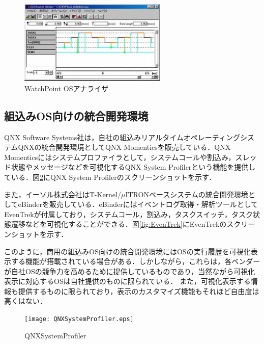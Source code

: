 \begin{figure}
\begin{center}
\includegraphics[height=4cm]{watchpoint.eps}
\caption{WatchPoint OSアナライザ}
\label{fig:watchpoint}
\end{center}
\end{figure}

\subsection*{組込みOS向けの統合開発環境}

QNX Software Systems社は，自社の組込みリアルタイムオペレーティングシステムQNXの統合開発環境としてQNX Momenticsを販売している．QNX Momenticsにはシステムプロファイラとして，システムコールや割込み，スレッド状態やメッセージなどを可視化するQNX System Profiler\cite{QNXMomentics}という機能を提供している．図\ref{fig:QNXSystemProfiler}にQNX System Profilerのスクリーンショットを示す．

また，イーソル株式会社はT-Kernel/$\mu$ITRONベースシステムの統合開発環境としてeBinder\cite{eBinder}を販売している．eBinderにはイベントログ取得・解析ツールとしてEvenTrekが付属しており，システムコール，割込み，タスクスイッチ，タスク状態遷移などを可視化することができる．図\ref{fig:EvenTrek}にEvenTrekのスクリーンショットを示す．

このように，商用の組込みOS向けの統合開発環境にはOSの実行履歴を可視化表示する機能が搭載されている場合がある．しかしながら，これらは，各ベンダーが自社OSの競争力を高めるために提供しているものであり，当然ながら可視化表示に対応するOSは自社提供のものに限られている．
また，可視化表示する情報も提供するものに限られており，表示のカスタマイズ機能もそれほど自由度は高くはない．

\begin{figure}
\begin{center}
\texttt{[image: QNXSystemProfiler.eps]}
\caption{QNXSystemProfiler}
\label{fig:QNXSystemProfiler}
\end{center}
\end{figure}


